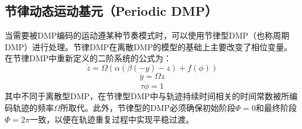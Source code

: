 \subsection{节律动态运动基元（Periodic DMP）}
当需要被DMP编码的运动遵某种节奏模式时，可以使用节律型DMP（也称周期DMP）进行处理。节律DMP在离散DMP的模型的基础上主要改变了相位变量。在节律DMP中重新定义的二阶系统的公式为：
\begin{equation}
    \dot{z}=\Omega(\alpha(\beta(-y)-z)+f(\phi))
    \label{eq:2-8}
\end{equation}
\begin{equation}
    \dot{y}=\Omega z
    \label{eq:2-9}
\end{equation}
\begin{equation}
    \tau \dot{\phi}=1
    \label{eq:2-10}
\end{equation}
其中不同于离散型DMP，在节律型DMP中与轨迹持续时间相关的时间常数被所编码轨迹的频率$\Omega$所取代。此外，节律型的DMP必须确保初始阶段$\Phi = 0$和最终阶段$\Phi = 2\pi$一致，以便在轨迹重复过程中实现平稳过渡。